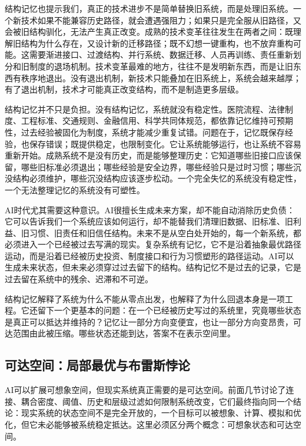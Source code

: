 
结构记忆也提示我们，真正的技术进步不是简单替换旧系统，而是处理旧系统。一个新技术如果不能兼容历史路径，就会遭遇强阻力；如果只是完全服从旧路径，又会被旧结构驯化，无法产生真正改变。成熟的技术变革往往发生在两者之间：既理解旧结构为什么存在，又设计新的迁移路径；既不幻想一键重构，也不放弃重构可能。这需要渐进接口、过渡结构、并行系统、数据迁移、人员再训练、责任重新划分和旧制度的退场机制。技术变革最难的地方，往往不是发明新东西，而是让旧东西有秩序地退出。没有退出机制，新技术只能叠加在旧系统上，系统会越来越厚；有了退出机制，技术才可能真正改变结构，而不是制造更多层级。

结构记忆并不只是负担。没有结构记忆，系统就没有稳定性。医院流程、法律制度、工程标准、交通规则、金融信用、科学共同体规范，都依靠记忆维持可预期性，过去经验被固化为制度，系统才能减少重复试错。问题在于，记忆既保存经验，也保存错误；既提供稳定，也限制变化。它让系统能够运行，也让系统不容易重新开始。成熟系统不是没有历史，而是能够整理历史：它知道哪些旧接口应该保留，哪些旧标准必须退出；哪些经验是安全边界，哪些经验只是过时习惯；哪些沉没结构必须维护，哪些沉没结构应该逐步松动。一个完全失忆的系统没有稳定性，一个无法整理记忆的系统没有可塑性。

AI时代尤其需要这种意识。AI很擅长生成未来方案，却不能自动消除历史负债：它可以告诉我们一个系统应该如何运行，却不能替我们清理旧数据、旧标准、旧利益、旧习惯、旧责任和旧信任结构。未来不是从空白处开始的，每一个新系统，都必须进入一个已经被过去写满的现实。复杂系统有记忆，它不是沿着抽象最优路径运动，而是沿着已经被历史投资、制度接口和行为习惯塑形的路径运动。AI可以生成未来状态，但未来必须穿过过去留下的结构。结构记忆不是过去的记录，它是过去留在系统中的残余、迟滞和不可逆。

结构记忆解释了系统为什么不能从零点出发，也解释了为什么回退本身是一项工程。它还留下一个更基本的问题：在一个已经被历史写过的系统里，究竟哪些状态是真正可以抵达并维持的？记忆让一部分方向变便宜，也让一部分方向变昂贵，可达范围由此被压缩。哪些状态还能到达，答案不在表示空间里。

\subsection{可达空间：局部最优与布雷斯悖论}

AI可以扩展可想象空间，但现实系统真正需要的是可达空间。前面几节讨论了连接、耦合密度、阈值、历史和层级过滤如何限制系统改变，它们最终指向同一个结论：现实系统的状态空间不是完全开放的，一个目标可以被想象、计算、模拟和优化，但它未必能够被系统稳定抵达。这里必须区分两个概念：可想象状态和可达空间。

